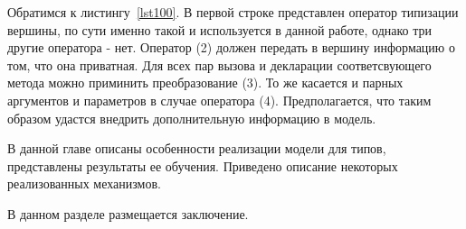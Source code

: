 \documentclass[times,specification,annotation]{itmo-student-thesis}
\begin{document}
Обратимся к листингу~\ref{lst100}. В первой строке представлен оператор типизации вершины, по сути именно такой и используется в данной работе, однако три другие оператора - нет. Оператор (2) должен передать в вершину информацию о том, что она приватная. Для всех пар вызова и декларации соответсвующего метода можно приминить преобразование (3). То же касается и парных аргументов и параметров в случае оператора (4). Предполагается, что таким образом удастся внедрить дополнительную информацию в модель.

\chapterconclusion
В данной главе описаны особенности реализации модели для типов, представлены результаты ее обучения. Приведено описание некоторых реализованных механизмов.


\startconclusionpage

В данном разделе размещается заключение.

\printmainbibliography
\end{document}

